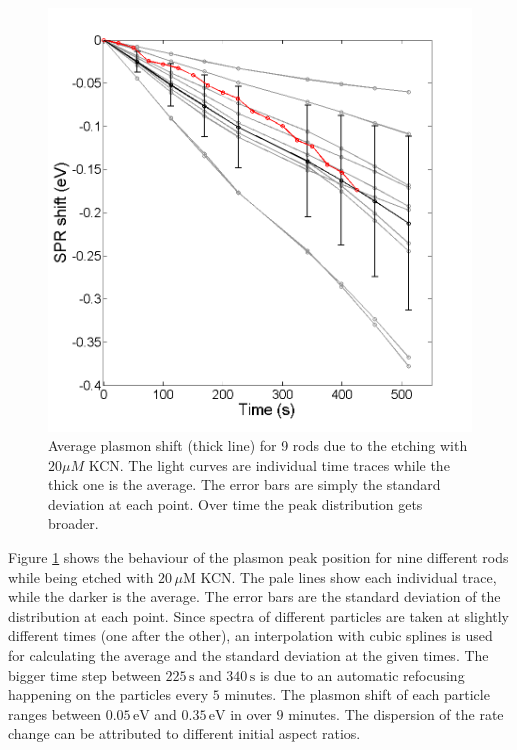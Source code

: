 \documentclass{article}
\begin{document}
\begin{figure}[p]
 \centering
 \includegraphics[width=0.95\linewidth]{plasmon_average.png}
 \caption{Average plasmon shift (thick line) for 9 rods due to the etching with
 $20\mu M$ KCN. The light curves are individual time traces while the thick one
 is the average. The error bars are simply the standard deviation at each point. Over
 time the peak distribution gets broader.}
 \label{fig:plasmon_average}
\end{figure}

Figure \ref{fig:plasmon_average} shows the behaviour of the plasmon peak
position for nine different rods while being etched with $20\,\mu\textrm{M}$
KCN. The pale lines show each individual trace, while the darker is the average.
The error bars are the standard deviation of the distribution at each point.
Since spectra of different particles are taken at slightly different times (one
after the other), an interpolation with cubic splines is used for calculating
the average and the standard deviation at the given times. The bigger time step
between $225\,\textrm{s}$ and $340\,\textrm{s}$ is due to an automatic
refocusing happening on the particles every $5$ minutes. The plasmon shift of
each particle ranges between $0.05\,\textrm{eV}$ and $0.35\,\textrm{eV}$ in over
$9$ minutes. The dispersion of the rate change can be attributed to different
initial aspect ratios. 
\end{document}
